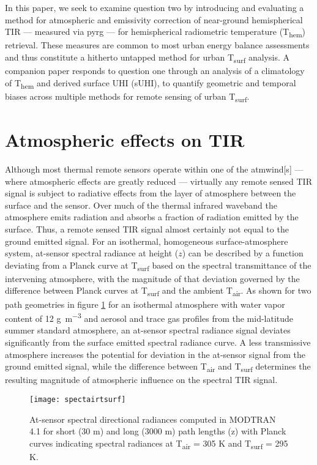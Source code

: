 \noindent In this paper, we seek to examine question two by introducing and evaluating a method for atmospheric and emissivity correction of near-ground hemispherical TIR --- measured via \gls{pyrg} --- for hemispherical radiometric temperature (T\textsubscript{hem}) retrieval. These measures are common to most urban energy balance assessments and thus constitute a hitherto untapped method for urban T\textsubscript{surf} analysis. A companion paper responds to question one through an analysis of a climatology of T\textsubscript{hem} and derived surface UHI (sUHI), to quantify geometric and temporal biases across multiple methods for remote sensing of urban T\textsubscript{surf}.

\section{Atmospheric effects on TIR}

Although most thermal remote sensors operate within one of the \gls{atmwind}[s] --- where atmospheric effects are greatly reduced --- virtually any remote sensed TIR signal is subject to radiative effects from the layer of atmosphere between the surface and the sensor. Over much of the thermal infrared \gls{waveband} the atmosphere emits radiation and absorbs a fraction of radiation emitted by the surface. Thus, a remote sensed TIR signal almost certainly not equal to the ground emitted signal. For an isothermal, homogeneous surface-atmosphere system, at-sensor spectral radiance at height ($z$) can be described by a function deviating from a Planck curve at T\textsubscript{surf} based on the spectral transmittance of the intervening atmosphere, with the magnitude of that deviation governed by the difference between Planck curves at T\textsubscript{surf} and the ambient T\textsubscript{air}. As shown for two path geometries in figure \ref{spectairtsurf} for an isothermal atmosphere with water vapor content of 12 \si{\gram\per\meter\cubed} and aerosol and trace gas profiles from the mid-latitude summer standard atmosphere, an at-sensor spectral radiance signal deviates significantly from the surface emitted spectral radiance curve. A less transmissive atmosphere increases the potential for deviation in the at-sensor signal from the ground emitted signal, while the difference between T\textsubscript{air} and T\textsubscript{surf} determines the resulting magnitude of atmospheric influence on the spectral TIR signal.

\begin{figure}[!ht]
	\texttt{[image: spectairtsurf]}
	\caption{At-sensor spectral directional radiances computed in MODTRAN 4.1 \cite{Berk1987} for short (30 \si{m}) and long (3000 \si{m}) path lengths (z) with Planck curves indicating spectral radiances at T\textsubscript{air} = 305 \si{K} and T\textsubscript{surf} = 295 \si{K}.}
	\label{spectairtsurf}
\end{figure}

